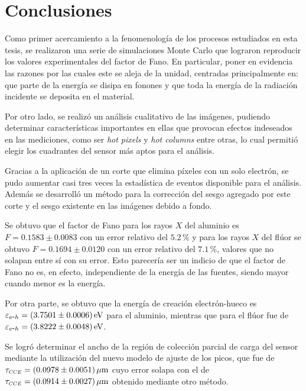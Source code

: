 \chapter{Conclusiones}
\noindent Como primer acercamiento a la fenomenología de los procesos estudiados en esta tesis, se realizaron una serie de simulaciones Monte Carlo que lograron reproducir los valores experimentales del factor de Fano. En particular, poner en evidencia las razones por las cuales este se aleja de la unidad, centradas principalmente en: que parte de la energía se disipa en fonones y que toda la energía de la radiación incidente se deposita en el material.

Por otro lado, se realizó un análisis cualitativo de las imágenes, pudiendo determinar características importantes en ellas que provocan efectos indeseados en las mediciones, como ser \textit{hot pixels} y \textit{hot columns} entre otras, lo cual permitió elegir los cuadrantes del sensor más aptos para el análisis.

Gracias a la aplicación de un corte que elimina píxeles con un solo electrón, se pudo aumentar casi tres veces la estadística de eventos disponible para el análisis. Además se desarrolló un método para la corrección del sesgo agregado por este corte y el sesgo existente en las imágenes debido a fondo. 



Se obtuvo que el factor de Fano para los rayos $X$ del aluminio es $F = 0.1583 \pm 0.0083 $ con un error relativo del $5.2\,\%$ y para los rayos $X$ del flúor se obtuvo $F = 0.1694 \pm 0.0120$ con un error relativo del $7.1\,\%$, valores que no solapan entre sí con su error. Esto parecería ser un indicio de que el factor de Fano no es, en efecto, independiente de la energía de las fuentes, siendo mayor cuando menor es la energía.

Por otra parte, se obtuvo que la energía de creación electrón-hueco es $\varepsilon_{\eh}=(3.7501\pm0.0006)\,\si{eV}$ para el aluminio, mientras que para el flúor fue de $\varepsilon_{\eh}=(3.8222\pm0.0048)\,\si{eV}$.

Se logró determinar el ancho de la región de colección parcial de carga del sensor mediante la utilización del nuevo modelo de ajuste de los picos, que fue de $\tau_{\scaleto{CCE}{4pt}}=(0.0978\pm 0.0051)\,\si{\mu m}$ cuyo error solapa con el de $\tau_{\scaleto{CCE}{4pt}}=(0.0914\pm 0.0027)\,\si{\mu m} $ obtenido mediante otro método\cite{PCC-CCE}.

